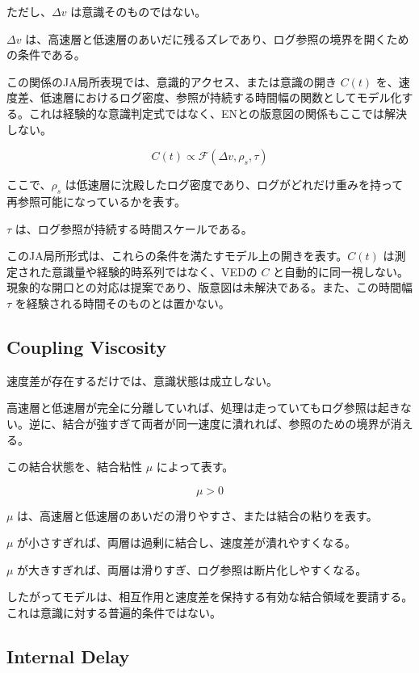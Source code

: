 ただし、$\Delta v$ は意識そのものではない。

$\Delta v$ は、高速層と低速層のあいだに残るズレであり、ログ参照の境界を開くための条件である。

この関係のJA局所表現では、意識的アクセス、または意識の開き $C(t)$ を、速度差、低速層におけるログ密度、参照が持続する時間幅の関数としてモデル化する。これは経験的な意識判定式ではなく、ENとの版意図の関係もここでは解決しない。

\begin{equation}
C(t) \propto \mathcal{F}(\Delta v, \rho_s, \tau)
\end{equation}

ここで、$\rho_s$ は低速層に沈殿したログ密度であり、ログがどれだけ重みを持って再参照可能になっているかを表す。

$\tau$ は、ログ参照が持続する時間スケールである。

このJA局所形式は、これらの条件を満たすモデル上の開きを表す。$C(t)$ は測定された意識量や経験的時系列ではなく、VEDの $C$ と自動的に同一視しない。現象的な開口との対応は提案であり、版意図は未解決である。また、この時間幅 $\tau$ を経験される時間そのものとは置かない。

\subsection{Coupling Viscosity}

速度差が存在するだけでは、意識状態は成立しない。

高速層と低速層が完全に分離していれば、処理は走っていてもログ参照は起きない。逆に、結合が強すぎて両者が同一速度に潰れれば、参照のための境界が消える。

この結合状態を、結合粘性 $\mu$ によって表す。

\begin{equation}
\mu > 0
\end{equation}

$\mu$ は、高速層と低速層のあいだの滑りやすさ、または結合の粘りを表す。

$\mu$ が小さすぎれば、両層は過剰に結合し、速度差が潰れやすくなる。

$\mu$ が大きすぎれば、両層は滑りすぎ、ログ参照は断片化しやすくなる。

したがってモデルは、相互作用と速度差を保持する有効な結合領域を要請する。これは意識に対する普遍的条件ではない。

\subsection{Internal Delay}

